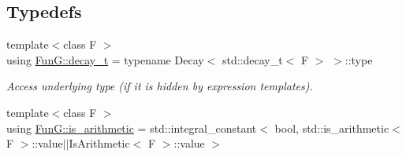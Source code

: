 \subsection*{Typedefs}
\begin{DoxyCompactItemize}
\item 
{\footnotesize template$<$class F $>$ }\\using \hyperlink{namespaceFunG_a195ac37d8696970c89b112c81a1e4d6e}{Fun\+G\+::decay\+\_\+t} = typename Decay$<$ std\+::decay\+\_\+t$<$ F $>$ $>$\+::type
\begin{DoxyCompactList}\small\item\em Access underlying type (if it is hidden by expression templates). \end{DoxyCompactList}\item 
{\footnotesize template$<$class F $>$ }\\using \hyperlink{namespaceFunG_a6dd0f05fb05ea031b7b9678fe3730c73}{Fun\+G\+::is\+\_\+arithmetic} = std\+::integral\+\_\+constant$<$ bool, std\+::is\+\_\+arithmetic$<$ F $>$\+::value$\vert$$\vert$Is\+Arithmetic$<$ F $>$\+::value $>$
\end{DoxyCompactItemize}
